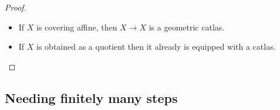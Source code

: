 \begin{proof}
\begin{itemize}
	\item If 	$X$ is covering affine, then $X \to X$ is a geometric catlas. 
	\item If $X$ is obtained as a quotient then it already is equipped with a catlas. %
	
\end{itemize}
\end{proof}

\subsection{Needing finitely many steps}

